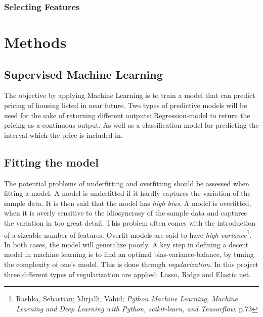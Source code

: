 \documentclass[12pt,a4paper]{article}
\begin{document}
\subsubsection{Selecting Features}


\section{Methods}
\subsection{Supervised Machine Learning}
The objective by applying Machine Learning is to train a model that can predict pricing of housing listed in near future.
Two types of predictive models will be used for the sake of returning different outputs: Regression-model to return the pricing as a continuous output. As well as a classification-model for predicting the interval which the price is included in. 
\subsection{Fitting the model}
The potential problems of underfitting and overfitting should be assessed when fitting a model. A model is underfitted if it hardly captures the variation of the sample data. It is then said that the model has \textit{high bias}. A model is overfitted, when it is overly sensitive to the idiosyncrasy of the sample data and captures the variation in too great detail. This problem often comes with the introduction of a sizeable number of features. Overfit models are said to have \textit{high variance}\footnote{Rashka, Sebastian; Mirjalli, Vahid; \textit{Python Machine Learning, Machine Learning and Deep Learning with Python, scikit-learn, and Tensorflow}. p.73}. In both cases, the model will generalize poorly. A key step in defining a decent model in machine learning is to find an optimal bias-variance-balance, by tuning the complexity of one’s model. This is done through \textit{regularization}. In this project three different types of regularization are applied; Lasso, Ridge and Elastic net.   
\end{document}
